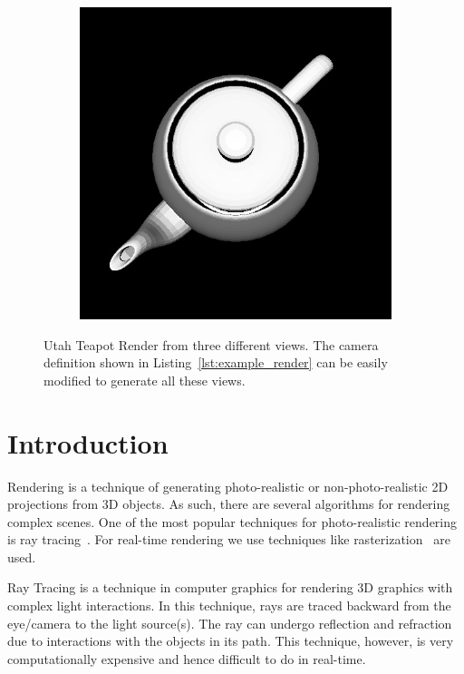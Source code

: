 \documentclass{juliacon}
\begin{document}
\begin{figure}[!htb]
\begin{subfigure}[b]{0.3\textwidth}
        \caption*{}
    \end{subfigure}
    \hfill
    \begin{subfigure}[b]{0.3\textwidth}
        \centering
        \includegraphics[width=\textwidth]{images/render/teapot_top.jpg}
        \caption*{}
    \end{subfigure}
    \caption{Utah Teapot Render from three different views. The camera definition shown in Listing~\protect\ref{lst:example_render} can be easily modified to generate all these views.}
    \label{fig:teapot_render}
\end{figure}

\section{Introduction}
\label{intro}

Rendering is a technique of generating photo-realistic or non-photo-realistic 2D projections from 3D objects. As such, there are several algorithms for rendering complex scenes. One of the most popular techniques for photo-realistic rendering is ray tracing~\cite{Appel:1968:TSM:1468075.1468082}. For real-time rendering we use techniques like rasterization~\cite{Pineda:1988:PAP:54852.378457} are used.

Ray Tracing is a technique in computer graphics for rendering 3D graphics with complex light interactions. In this technique, rays are traced backward from the eye/camera to the light source(s). The ray can undergo reflection and refraction due to interactions with the objects in its path. This technique, however, is very computationally expensive and hence difficult to do in real-time. 
\end{document}
